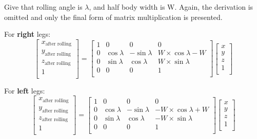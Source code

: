 Give that rolling angle is $\lambda$, and half body width is W. Again, the derivation is omitted and only the final form of matrix multiplication is presented.

For \textbf{right} legs:
\begin{equation}
   \begin{bmatrix}
   x_\text{after rolling} \\
   y_\text{after rolling} \\
   z_\text{after rolling} \\
   1                      \\
   \end{bmatrix}
   =
   \begin{bmatrix}
   1 & 0 & 0 & 0 \\
   0 & \cos\lambda & -\sin\lambda & W \times \cos\lambda - W \\
   0 & \sin\lambda & \cos\lambda & W \times \sin\lambda \\
   0 & 0 & 0 & 1 \\
   \end{bmatrix}
   \begin{bmatrix}
   x \\
   y \\
   z \\
   1 \\
   \end{bmatrix}
\end{equation}

For \textbf{left} legs:
\begin{equation}
   \begin{bmatrix}
   x_\text{after rolling} \\
   y_\text{after rolling} \\
   z_\text{after rolling} \\
   1                      \\
   \end{bmatrix}
   =
   \begin{bmatrix}
   1 & 0 & 0 & 0 \\
   0 & \cos\lambda & -\sin\lambda & -W \times \cos\lambda + W \\
   0 & \sin\lambda & \cos\lambda & -W \times \sin\lambda \\
   0 & 0 & 0 & 1 \\
   \end{bmatrix}
   \begin{bmatrix}
   x \\
   y \\
   z \\
   1 \\
   \end{bmatrix}
\end{equation}

